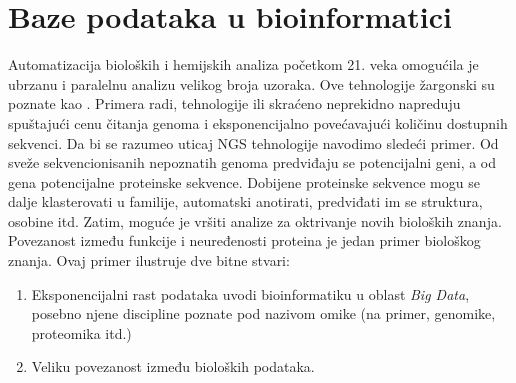 \chapter{Baze podataka u bioinformatici} %

\label{Baze} %

Automatizacija bioloških i hemijskih analiza početkom 21. veka omogućila je
ubrzanu i paralelnu analizu velikog broja uzoraka. Ove tehnologije žargonski su
poznate kao  . Primera radi, tehnologije 
 ili skraćeno  neprekidno napreduju
spuštajući cenu čitanja genoma i eksponencijalno povećavajući količinu dostupnih
sekvenci. Da bi se razumeo uticaj NGS tehnologije navodimo sledeći primer.
Od sveže sekvencionisanih nepoznatih genoma predviđaju se
potencijalni geni, a od gena potencijalne proteinske sekvence.  Dobijene
proteinske sekvence mogu se dalje klasterovati u familije, automatski
anotirati, predviđati im se struktura, osobine itd.  Zatim, moguće je vršiti
analize za oktrivanje novih bioloških znanja. Povezanost između funkcije i
neuređenosti proteina je jedan primer biološkog znanja. 
Ovaj primer ilustruje dve bitne stvari:
\begin{enumerate}
  \item Eksponencijalni rast podataka uvodi bioinformatiku u oblast \textit{Big Data},
    posebno njene discipline poznate pod nazivom omike (na primer, genomike, proteomika itd.)
  \item Veliku povezanost između bioloških podataka.
\end{enumerate}

